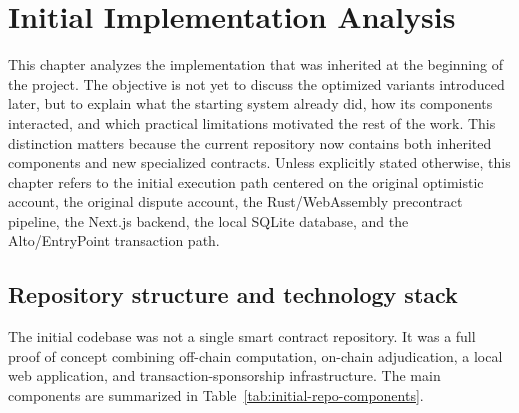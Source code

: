 \chapter{Initial Implementation Analysis}
\label{chap:initial-implementation}

This chapter analyzes the implementation that was inherited at the beginning of the project.
The objective is not yet to discuss the optimized variants introduced later, but to explain
what the starting system already did, how its components interacted, and which practical
limitations motivated the rest of the work. This distinction matters because the current
repository now contains both inherited components and new specialized contracts. Unless
explicitly stated otherwise, this chapter refers to the initial execution path centered on
the original optimistic account, the original dispute account, the Rust/WebAssembly
precontract pipeline, the Next.js backend, the local SQLite database, and the Alto/EntryPoint
transaction path.

\section{Repository structure and technology stack}

The initial codebase was not a single smart contract repository. It was a full proof of
concept combining off-chain computation, on-chain adjudication, a local web application, and
transaction-sponsorship infrastructure. The main components are summarized in
Table~\ref{tab:initial-repo-components}.

